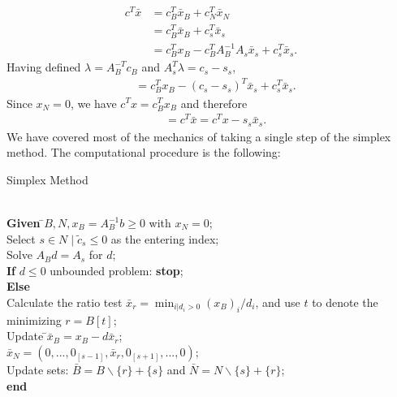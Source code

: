 \documentclass[a4paper,10 pt,titlepage,twoside]{book}
\theoremstyle{plain}
\theoremstyle{definition}
\theoremstyle{remark}
\begin{document}
\begin{align*}
c^{T}\bar{x} &=c^{T}_{B}\bar{x}_{B}+c^{T}_{N}\bar{x}_{N}\\
			 &=c_{B}^{T}\bar{x}_{B}+c^{T}_{s}\bar{x}_{s}\\
			 &=c_{B}^{T}x_{B}-c^{T}_{B}A_{B}^{-1}A_{s}\bar{x}_{s}+c_{s}^{T}\bar{x}_{s}.
\end{align*}
Having defined $ \lambda=A_{B}^{-T}c_{B}$ and $A^{T}_{s}\lambda = c_{s}-s_{s}$,
\begin{align*}
&= c^{T}_{B}x_{B}-(c_{s} -s_{s})^{T}\bar{x}_{s} +c_{s}^{T}\bar{x}_{s}.
\end{align*}
Since $x_{N}=0$, we have $c^{T}x=c^{T}_{B}x_{B}$ and therefore 
\begin{align*}
&=c^{T}\bar{x} = c^{T}x - s_{s}\bar{x}_{s}.
\end{align*}
We have covered most of the mechanics of taking a single step of the simplex method. The computational procedure is the following:
\\
\begin{algorithm}[H]\caption{\label{Alg:1}Simplex Method}
\begin{tabbing}
	\\
	\textbf{Given} \=$B, N, x_{B} = A_{B}^{-1}b\geq 0$ with $x_{N}=0$;\\
	\> Select $s\in N\;|\;\widetilde{c}_{s}\leq 0$ as the entering index;\\
	\> Solve $A_{B}d = A_{s}$ for $d$;\\
	\>\textbf{If} {$d \leq 0$} unbounded problem: \textbf{stop};\\
	\>\textbf{Else} \=\\
	\>\>Calculate the ratio test $\bar{x}_{r} = \min_{i | d_{i} > 0}(x_{B})_{i}/d_{i}$, and use $t$ to denote the minimizing $r = B[t]$;\\
	\>\>Update \=$\bar{x}_{B} = x_{B}-d\bar{x}_{r}$;\\
	\>\>\>$\bar{x}_{N} = (0,...,0_{[s-1]},\bar{x}_{r},0_{[s+1]},...,0)$;\\
	\>\> Update sets: $\bar{B} = B \backslash \{r\} + \{s\}$ and $\bar{N} = N \backslash \{s\} + \{r\}$;\\
	\textbf{end}
\end{tabbing}
\end{algorithm}
\end{document}
